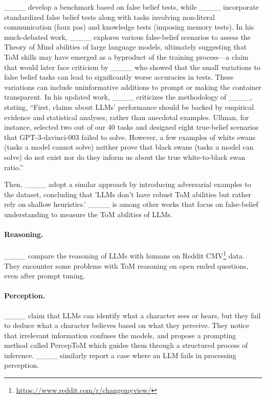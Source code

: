 ____ develop a benchmark based on false belief tests, while ____ incorporate standardized false belief tests along with tasks involving non-literal communication (faux pas) and knowledge tests (imposing memory tests). In his much-debated work, ____ explores various false-belief scenarios to assess the Theory of Mind abilities of large language models, ultimately suggesting that ToM skills may have emerged as a byproduct of the training process—a claim that would later face criticism by ____ who showed that the small variations to false belief tasks can lead to significantly worse accuracies in tests. These variations can include uninformative additions to prompt or making the container transparent. 
In his updated work, ____ criticizes the methodology of ____, stating, \enquote{First, claims about LLMs’ performance should be backed by empirical evidence and statistical analyses, rather than anecdotal examples. Ullman, for instance, selected two out of our 40 tasks and designed eight true-belief scenarios that GPT-3-davinci-003 failed to solve. However, a few examples of white swans (tasks a model cannot solve) neither prove that black swans (tasks a model can solve) do not exist nor do they inform us about the true white-to-black swan ratio.}

Then, ____ adopt a similar approach by introducing adversarial examples to the dataset, concluding that 'LLMs don’t have robust ToM abilities but rather rely on shallow heuristics.' ____ is among other works that focus on false-belief understanding to measure the ToM abilities of LLMs.

\paragraph{Reasoning.} ____ compare the reasoning of LLMs with humans on Reddit CMV\footnote{\url{https://www.reddit.com/r/changemyview/}} data. They encounter some problems with ToM reasoning on open ended questions, even after prompt tuning.

\paragraph{Perception.} ____ claim that LLMs can identify what a character sees or hears, but they fail to deduce what a character believes based on what they perceive. They notice that irrelevant information confuses the models, and propose a prompting method called PercepToM which guides them through a structured process of inference. ____ similarly report a case where an LLM fails in processing perception.

